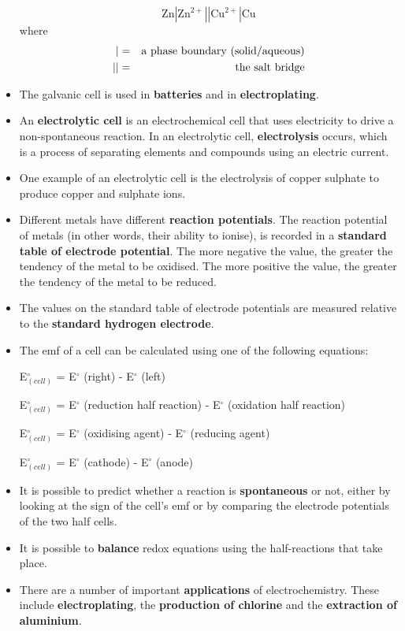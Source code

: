 \begin{itemize}
{\begin{equation*}
\text{Zn}|\text{Zn}^{2+}||\text{Cu}^{2+}|\text{Cu}
\end{equation*}
where
\begin{eqnarray*}
  | &=& \rm{a \ phase \ boundary \ (solid/aqueous)}\\
  || & = & \rm{the \ salt \ bridge}
\end{eqnarray*}
}
\item{The galvanic cell is used in \textbf{batteries} and in \textbf{electroplating}.}
\item{An \textbf{electrolytic cell} is an electrochemical cell that uses electricity to drive a non-spontaneous reaction. In an electrolytic cell, \textbf{electrolysis} occurs, which is a process of separating elements and compounds using an electric current.}
\item{One example of an electrolytic cell is the electrolysis of copper sulphate to produce copper and sulphate ions.}
\item{Different metals have different \textbf{reaction potentials}. The reaction potential of metals (in other words, their ability to ionise), is recorded in a \textbf{standard table of electrode potential}. The more negative the value, the greater the tendency of the metal to be oxidised. The more positive the value, the greater the tendency of the metal to be reduced.}
\item{The values on the standard table of electrode potentials are measured relative to the \textbf{standard hydrogen electrode}.}
\item{The emf of a cell can be calculated using one of the following equations:

E$^{\circ}_{(cell)}$ = E$^{\circ}$ (right) - E$^{\circ}$ (left)

E$^{\circ}_{(cell)}$ = E$^{\circ}$ (reduction half reaction) - E$^{\circ}$ (oxidation half reaction)

E$^{\circ}_{(cell)}$ = E$^{\circ}$ (oxidising agent) - E$^{\circ}$ (reducing agent)

E$^{\circ}_{(cell)}$ = E$^{\circ}$ (cathode) - E$^{\circ}$ (anode)
}
\item{It is possible to predict whether a reaction is \textbf{spontaneous} or not, either by looking at the sign of the cell's emf or by comparing the electrode potentials of the two half cells.}
\item{It is possible to \textbf{balance} redox equations using the half-reactions that take place.}
\item{There are a number of important \textbf{applications} of electrochemistry. These include \textbf{electroplating}, the \textbf{production of chlorine} and the \textbf{extraction of aluminium}.}
\end{itemize}

